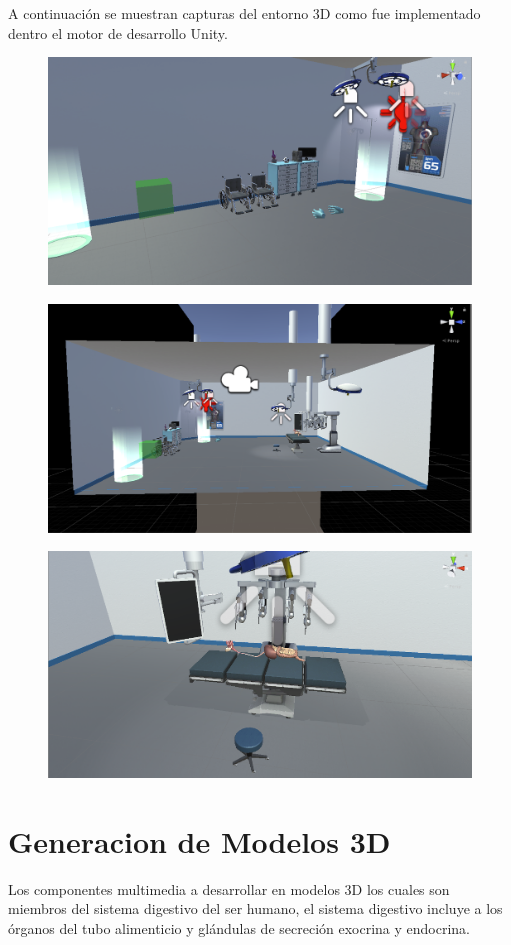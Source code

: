 A continuación se muestran capturas del entorno 3D como fue implementado dentro el motor de desarrollo Unity.\\

\begin{figure}[H]
	\begin{center}
 		\includegraphics[width = .5\textwidth]{source/images/image63.png}
	\end{center} 
\end{figure}

\begin{figure}[H]
	\begin{center}
 		\includegraphics[width = .5\textwidth]{source/images/image53.png}
	\end{center} 
\end{figure}

\begin{figure}[H]
	\begin{center}
 		\includegraphics[width = .5\textwidth]{source/images/image16.png}
	\end{center} 
\end{figure}

\section{Generacion de Modelos 3D}
Los componentes multimedia a desarrollar en modelos 3D los cuales son miembros del sistema digestivo del ser humano, el sistema digestivo incluye a los órganos del tubo alimenticio y glándulas de secreción exocrina y endocrina.\\

